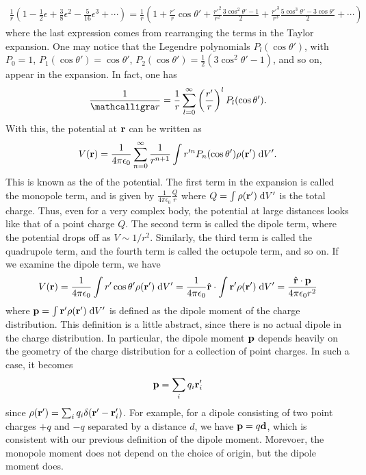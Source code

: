 \begin{align}
    \frac{1}{r} \left( 1 - \frac{1}{2} \epsilon + \frac{3}{8} \epsilon^{2} - \frac{5}{16} \epsilon^{3} + \cdots \right) = \frac{1}{r} \left( 1 + \frac{r'}{r} \cos \theta' + \frac{r'^{2}}{r^{2}} \frac{3 \cos^{2} \theta' - 1}{2} + \frac{r'^{3}}{r^{3}} \frac{5 \cos^{3} \theta' - 3 \cos \theta'}{2} + \cdots \right)
\end{align}
where the last expression comes from rearranging the terms in the Taylor expansion. One may notice that the Legendre polynomials $P_{l}(\cos \theta')$, with $P_{0} = 1$, $P_{1}(\cos \theta') = \cos \theta'$, $P_{2}(\cos \theta') = \frac{1}{2} (3 \cos^{2} \theta' - 1)$, and so on, appear in the expansion. In fact, one has
\begin{align}
    \frac{1}{\curs{r}} = \frac{1}{r} \sum_{l=0}^{\infty} \left( \frac{r'}{r} \right)^{l} P_{l}(\cos \theta').
\end{align}
With this, the potential at $\mathbf{r}$ can be written as
\begin{align}
    V(\mathbf{r}) = \frac{1}{4 \pi \epsilon_{0}} \sum_{n=0}^{\infty} \frac{1}{r^{n+1}} \int r'^{n} P_{n}(\cos \theta') \rho(\mathbf{r}') \; \mathrm{d}V'.
\end{align}
This is known as the  of the potential. The first term in the expansion is called the monopole term, and is given by $\frac{1}{4 \pi \epsilon_{0}} \frac{Q}{r}$ where $Q = \int \rho(\mathbf{r}') \; \mathrm{d}V'$ is the total charge. Thus, even for a very complex body, the potential at large distances looks like that of a point charge $Q$. The second term is called the dipole term, where the potential drops off as $V \sim 1/r^{2}$. Similarly, the third term is called the quadrupole term, and the fourth term is called the octupole term, and so on. If we examine the dipole term, we have
\begin{align}
    V(\mathbf{r}) = \frac{1}{4 \pi \epsilon_{0}} \int r' \cos \theta' \rho(\mathbf{r}') \; \mathrm{d}V' = \frac{1}{4 \pi \epsilon_{0}} \hat{\mathbf{r}} \cdot \int \mathbf{r}' \rho(\mathbf{r}') \; \mathrm{d}V' = \frac{\hat{\mathbf{r}} \cdot \mathbf{p}}{4 \pi \epsilon_{0} r^{2}}
\end{align}
where $\mathbf{p} = \int \mathbf{r}' \rho(\mathbf{r}') \; \mathrm{d}V'$ is defined as the dipole moment of the charge distribution. This definition is a little abstract, since there is no actual dipole in the charge distribution. In particular, the dipole moment $\mathbf{p}$ depends heavily on the geometry of the charge distribution for a collection of point charges. In such a case, it becomes
\begin{align}
    \mathbf{p} = \sum_{i} q_{i} \mathbf{r}_{i}'
\end{align}
since $\rho(\mathbf{r}') = \sum_{i} q_{i} \delta(\mathbf{r}' - \mathbf{r}_{i}')$. For example, for a dipole consisting of two point charges $+q$ and $-q$ separated by a distance $d$, we have $\mathbf{p} = q \mathbf{d}$, which is consistent with our previous definition of the dipole moment. Morevoer, the monopole moment does not depend on the choice of origin, but the dipole moment does.

